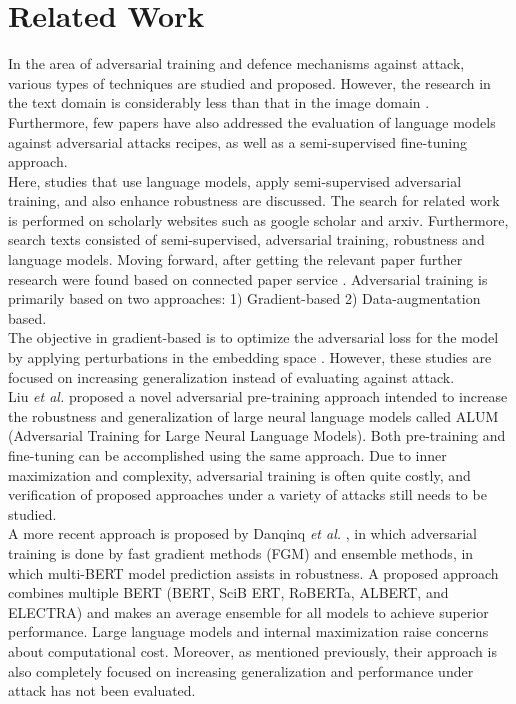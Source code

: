 \documentclass[%
	BCOR=8mm, %
	DIV=12,
	toc=bibliography, %
	toc=listof, %
	oneside, %
	egregdoesnotlikesansseriftitles, %
	]{scrbook}
\begin{document}
\chapter{Related Work}
\label{chapter:relatedwork}
In the area of adversarial training and defence mechanisms against attack, various types of techniques are studied and proposed. However, the research in the text domain is considerably less than that in the image domain \cite{wang_towards_2021}. Furthermore, few papers have also addressed the evaluation of language models against adversarial attacks recipes, as well as a semi-supervised fine-tuning approach.\\
 Here, studies that use language models, apply semi-supervised adversarial training, and also enhance robustness are discussed.  The search for related work is performed on scholarly websites such as google scholar and arxiv. Furthermore, search texts consisted of semi-supervised, adversarial training, robustness and language models. Moving forward,  after getting the relevant paper further research were found based on connected paper service \cite{noauthor_connected_nodate-1}.
Adversarial training is primarily based on two approaches: 1) Gradient-based 2) Data-augmentation based. \\
The objective in gradient-based  is to optimize the adversarial loss for the model by applying perturbations in the embedding space \cite{liu_adversarial_2020,goodfellow_explaining_2015,zhu_at-bert_2021,miyato_adversarial_2017,jiang_smart_2020-1}.  However, these studies are focused on increasing generalization instead of evaluating against attack.\\
 Liu \textit{et al.} \cite{liu_adversarial_2020} proposed a novel adversarial pre-training approach intended to increase the robustness and generalization of large neural language models called ALUM (Adversarial Training for Large Neural Language Models). Both pre-training and fine-tuning can be accomplished using the same approach. Due to inner maximization and complexity, adversarial training is often quite costly, and verification of proposed approaches under a variety of attacks still needs to be studied.\\
A more recent approach is proposed by Danqinq \textit{et al.} \cite{zhu_at-bert_2021}, in which adversarial training is done by fast gradient methods (FGM) \cite{miyato_adversarial_2017} and ensemble methods, in which multi-BERT model prediction assists in robustness. A proposed approach combines multiple BERT (BERT, SciB ERT, RoBERTa, ALBERT, and ELECTRA) and makes an average ensemble for all models to achieve superior performance. Large language models and internal maximization raise concerns about computational cost. Moreover, as mentioned previously, their approach is also completely focused on increasing generalization and performance under attack has not been evaluated.\\
\end{document}
